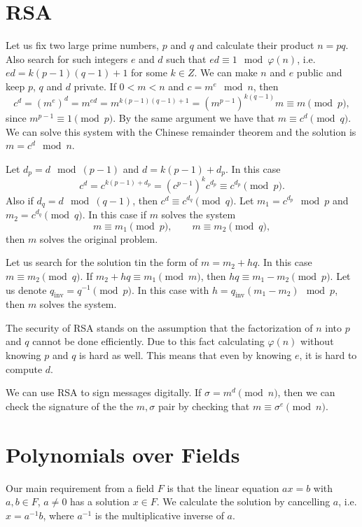 \documentclass{article}
\begin{document}
\section{RSA}

Let us fix two large prime numbers, $p$ and $q$ and calculate their product $n=pq$.
Also search for such integers $e$ and $d$ such that $ed \equiv 1 \mod \varphi(n)$, i.e. $ed = k(p-1)(q-1) + 1$ for some $k \in Z$.
We can make $n$ and $e$ public and keep $p$, $q$ and $d$ private.
If $0 < m < n$ and $c = m^e \mod n$, then
\[
    c^d = (m^e)^d = m^{ed} = m^{k(p-1)(q-1)+1} = (m^{p-1})^{k(q-1)}m \equiv m \pmod{p},
\]
since $m^{p-1} \equiv 1 \pmod{p}$. By the same argument we have that $m \equiv c^d \pmod{q}$.
We can solve this system with the Chinese remainder theorem and the solution is $m = c^d \mod n$.

Let $d_p = d \mod (p-1)$ and $d = k(p-1) + d_p$. In this case
\[
    c^d = c^{k(p-1)+d_p} = (c^{p-1})^k c^{d_p} \equiv c^{d_p} \pmod{p}.
\]
Also if $d_q = d \mod (q-1)$, then $c^d \equiv c^{d_q} \pmod{q}$.
Let $m_1 = c^{d_p} \mod p$ and $m_2 = c^{d_q} \pmod q$.
In this case if $m$ solves the system
\[
    m \equiv m_1 \pmod{p}, \qquad m \equiv m_2 \pmod{q},
\]
then $m$ solves the original problem.

Let us search for the solution tin the form of $m=m_2 + hq$.
In this case $m \equiv m_2 \pmod{q}$.
If $m_2 + hq \equiv m_1 \pmod{m}$, then $hq \equiv m_1 - m_2 \pmod{p}$.
Let us denote $q_{\mathrm{inv}}=q^{-1} \pmod{p}$.
In this case with $h = q_{\mathrm{inv}}(m_1 - m_2) \mod p$, then $m$ solves the system.

The security of RSA stands on the assumption that the factorization of $n$ into $p$ and $q$ cannot be done efficiently.
Due to this fact calculating $\varphi(n)$ without knowing $p$ and $q$ is hard as well.
This means that even by knowing $e$, it is hard to compute $d$.

We can use RSA to sign messages digitally.
If $\sigma = m^d \pmod n$, then we can check the signature of the the $m, \sigma$ pair by checking that $m \equiv \sigma^e \pmod{n}$.


\section{Polynomials over Fields}

Our main requirement from a field $F$ is that the linear equation $ax=b$ with $a, b \in F$, $a\neq 0$ has a solution $x \in F$.
We calculate the solution by cancelling $a$, i.e. $x=a^{-1}b$, where $a^{-1}$ is the multiplicative inverse of $a$.
\end{document}
